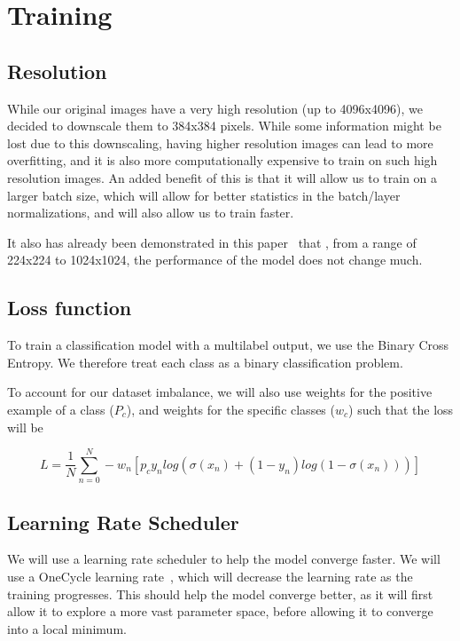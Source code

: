 \documentclass[11pt]{article}
\begin{document}
    \section{Training}

    \subsection{Resolution}

        While our original images have a very high resolution (up to 4096x4096), we decided to downscale them to
        384x384 pixels. While some information might be lost due to this downscaling, having higher resolution images
        can lead to more overfitting, and it is also more computationally expensive to train on such high resolution
        images. An added benefit of this is that it will allow us to train on a larger batch size, which will allow
        for better statistics in the batch/layer normalizations, and will also allow us to train faster.

        It also has already been demonstrated in this paper~\cite{resolution} that , from a range of 224x224 to
        1024x1024, the performance of the model does not change much.

    \subsection{Loss function}
        To train a classification model with a multilabel output, we use the Binary Cross Entropy. We therefore treat
        each class as a binary classification problem.

        To account for our dataset imbalance, we will also use weights for the positive example of a class ($P_c$), and weights for the specific classes ($w_c$) such that the loss will be

        \begin{equation}
            L = \frac{1}{N}\sum_{n=0}^N -w_n[p_c y_n log(\sigma(x_n)+(1-y_n) log(1-\sigma(x_n)))]
        \end{equation}

    \subsection{Learning Rate Scheduler}

        We will use a learning rate scheduler to help the model converge faster. We will use a OneCycle learning rate~\cite{onecyclelr}, which will
        decrease the learning rate as the training progresses. This should help the model converge better, as it will first allow it to explore a more vast
        parameter space, before allowing it to converge into a local minimum.
\end{document}
